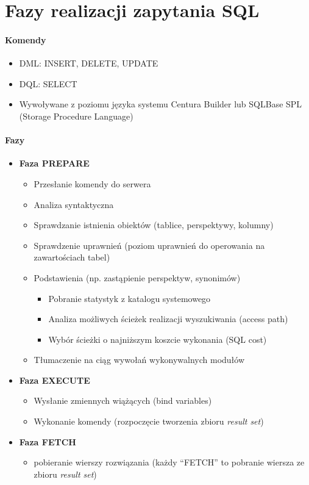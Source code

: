\documentclass[a4paper,twoside]{article}
\begin{document}
  	
  	\part*{Fazy realizacji zapytania SQL}
  	\subsection*{Komendy}
  	\begin{itemize}
  		\item DML: INSERT, DELETE, UPDATE
  		\item DQL: SELECT
  		\item Wywoływane  z poziomu języka systemu Centura Builder lub SQLBase SPL (Storage Procedure Language)
  	\end{itemize}
  	\subsection*{Fazy}
  	\begin{itemize}
  		\item \textbf{Faza PREPARE}		%
  		\begin{itemize}
  			\item Przesłanie komendy do serwera
  			\item Analiza syntaktyczna
  			\item Sprawdzanie istnienia obiektów (tablice, perspektywy, kolumny)
  			\item Sprawdzenie uprawnień (poziom uprawnień do operowania na zawartościach tabel)
  			\item Podstawienia (np. zastąpienie perspektyw, synonimów)
  			\begin{itemize}
  				\item Pobranie statystyk z katalogu systemowego
  				\item Analiza możliwych ścieżek realizacji wyszukiwania (access path)
  				\item Wybór ścieżki o najniższym koszcie wykonania (SQL cost)
  			\end{itemize}
  			\item Tłumaczenie na ciąg wywołań wykonywalnych modułów
  		\end{itemize}
  		\item \textbf{Faza EXECUTE}		%
  		\begin{itemize}
  			\item Wysłanie zmiennych wiążących (bind variables)
  			\item Wykonanie komendy (rozpoczęcie tworzenia zbioru \emph{result set})
  		\end{itemize}
  		\item \textbf{Faza FETCH}		%
  		\begin{itemize}
  			\item pobieranie wierszy rozwiązania (każdy “FETCH” to pobranie wiersza ze zbioru \emph{result set})
  		\end{itemize}
  	\end{itemize}
\end{document}
